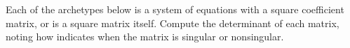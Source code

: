 Each of the archetypes below is a system of equations with a square coefficient matrix, or is a square matrix itself.  Compute the determinant of each matrix, noting how  indicates when the matrix is singular or nonsingular.\\
\\ 
\\ 
\\ 
\\
\\
